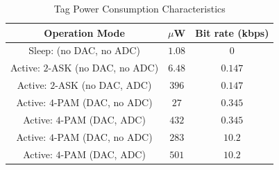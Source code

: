 \documentclass[journal]{IEEEtran}
\begin{document}
%
% 
%
\begin{table}[t]	
\renewcommand{\arraystretch}{1.1}
\centering
\caption{Tag Power Consumption Characteristics}
\scalebox{1}
{
\begin{tabular}{c||c||c}
\hline
\hline
Operation Mode  &  $\mu$W & Bit rate (kbps) \\
\hline
\hline
Sleep: (no DAC, no ADC) &$1.08$ & 0\\
\hline
Active: $2$-ASK (no DAC, no ADC)&$6.48$ & $0.147$\\
\hline
Active: $2$-ASK (no DAC, ADC)&$396$&$0.147$\\
\hline
Active: $4$-PAM (DAC, no ADC)&$27$ & $0.345$\\
\hline
Active: $4$-PAM  (DAC, ADC)&$432$& $0.345$\\
\hline
Active: $4$-PAM (DAC, no ADC)&$283$ & $10.2$\\
\hline
Active: $4$-PAM (DAC, ADC)&$501$ & $10.2$\\

\hline
\hline
\end{tabular}
}
\label{tab:power}
\end{table}
%
\end{document}
